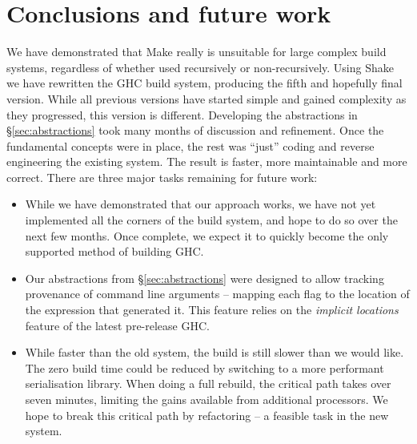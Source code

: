 \section{Conclusions and future work\label{section-conclusions}}

We have demonstrated that Make really is unsuitable for large complex build
systems, regardless of whether used recursively or non-recursively. Using Shake
we have rewritten the GHC build system, producing the fifth and hopefully final
version. While all previous versions have started simple and gained complexity
as they progressed, this version is different. Developing the abstractions in
\S\ref{sec:abstractions} took many months of discussion and refinement. Once the
fundamental concepts were in place, the rest was ``just'' coding and reverse
engineering the existing system. The result is faster, more maintainable and
more correct. There are three major tasks remaining for future work:

\begin{itemize}
\item While we have demonstrated that our approach works, we have not yet
implemented all the corners of the build system, and hope to do so over the next
few months. Once complete, we expect it to quickly become the only supported
method of building GHC.

\item Our abstractions from \S\ref{sec:abstractions} were designed to allow
tracking provenance of command line arguments -- mapping each flag to the
location of the expression that generated it. This feature relies on the
\emph{implicit locations} feature of the latest pre-release GHC.

\item While faster than the old system, the build is still slower than we would
like. The zero build time could be reduced by switching to a more performant serialisation
library. When doing a full rebuild, the critical path takes over seven minutes, limiting the
gains available from additional processors. We hope to break this critical path
by refactoring -- a feasible task in the new system.
\end{itemize}
